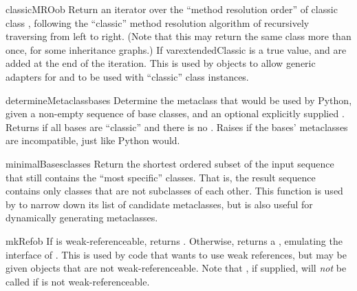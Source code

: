 \begin{verbatim%
}
\begin{verbatim%
}
\begin{verbatim%
}
\begin{verbatim%
}
\begin{verbatim%
}
\begin{verbatim%
}
\begin{funcdesc}{classicMRO}{ob }
Return an iterator over the ``method resolution order'' of classic class
, following the ``classic'' method resolution algorithm of recursively
traversing  from left to right.  (Note that this may return
the same class more than once, for some inheritance graphs.)  If
var{extendedClassic} is a true value,  and 
are added at the end of the iteration.  This is used by 
objects to allow generic adapters for  and 
to be used with ``classic'' class instances.
\end{funcdesc}




\begin{funcdesc}{determineMetaclass}{bases }
Determine the metaclass that would be used by Python, given a non-empty
sequence of base classes, and an optional explicitly supplied
.  Returns  if all bases are ``classic''
and there is no .  Raises  if the bases'
metaclasses are incompatible, just like Python would.
\end{funcdesc}


\begin{funcdesc}{minimalBases}{classes}
Return the shortest ordered subset of the input sequence  that
still contains the ``most specific'' classes.  That is, the result sequence
contains only classes that are not subclasses of each other.  This function is
used by  to narrow down its list of candidate
metaclasses, but is also useful for dynamically generating metaclasses.
\end{funcdesc}



\begin{funcdesc}{mkRef}{ob }
If  is weak-referenceable, returns
.  Otherwise, returns a
, emulating the interface of .
This is used by code that wants to use weak references, but may be given
objects that are not weak-referenceable.  Note that , if
supplied, will \emph{not} be called if  is not weak-referenceable.
\end{funcdesc}


\end{verbatim%
}
\end{verbatim%
}
\end{verbatim%
}
\end{verbatim%
}
\end{verbatim%
}
\end{verbatim%
}
